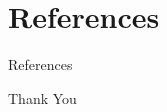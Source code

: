 \documentclass{beamer}
\theoremstyle{remark}
\theoremstyle{plain}
\theoremstyle{plain}
\begin{document}
\section{References}
\begin{frame}{References}
\end{frame}

\begin{frame}{Thank You}
\end{frame}
\end{document}
